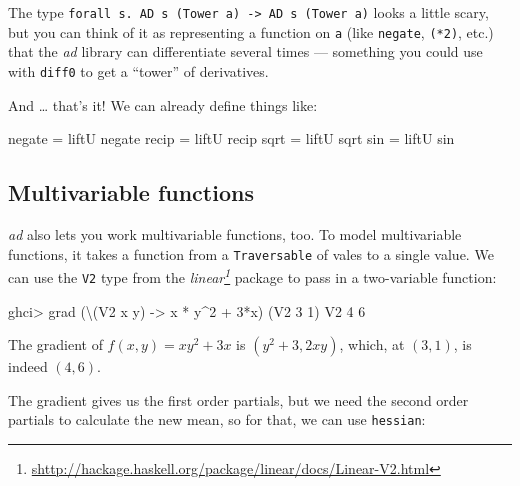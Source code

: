 \documentclass[]{article}
\newenvironment{Shaded}{}{}
\newcommand{\DataTypeTok}[1]{\textcolor[rgb]{0.56,0.13,0.00}{{#1}}}
\newcommand{\DecValTok}[1]{\textcolor[rgb]{0.25,0.63,0.44}{{#1}}}
\newcommand{\OtherTok}[1]{\textcolor[rgb]{0.00,0.44,0.13}{{#1}}}
\newcommand{\FunctionTok}[1]{\textcolor[rgb]{0.02,0.16,0.49}{{#1}}}
\newcommand{\NormalTok}[1]{{#1}}
\renewcommand{\href}[2]{#2\footnote{\url{#1}}}
\begin{document}
The type
\texttt{forall\ s.\ AD\ s\ (Tower\ a)\ -\textgreater{}\ AD\ s\ (Tower\ a)}
looks a little scary, but you can think of it as representing a function
on \texttt{a} (like \texttt{negate}, \texttt{(*2)}, etc.) that the
\emph{ad} library can differentiate several times --- something you
could use with \texttt{diff0} to get a ``tower'' of derivatives.

And \ldots{} that's it! We can already define things like:

\begin{Shaded}
\begin{Highlighting}[]
\NormalTok{negate }\FunctionTok{=} \NormalTok{liftU negate}
\NormalTok{recip  }\FunctionTok{=} \NormalTok{liftU recip}
\NormalTok{sqrt   }\FunctionTok{=} \NormalTok{liftU sqrt}
\NormalTok{sin    }\FunctionTok{=} \NormalTok{liftU sin}
\end{Highlighting}
\end{Shaded}

\subsection{Multivariable functions}\label{multivariable-functions}

\emph{ad} also lets you work multivariable functions, too. To model
multivariable functions, it takes a function from a \texttt{Traversable}
of vales to a single value. We can use the \texttt{V2} type from the
\emph{\href{shttp://hackage.haskell.org/package/linear/docs/Linear-V2.html}{linear}}
package to pass in a two-variable function:

\begin{Shaded}
\begin{Highlighting}[]
\NormalTok{ghci}\FunctionTok{>} \NormalTok{grad (\textbackslash{}(}\DataTypeTok{V2} \NormalTok{x y) }\OtherTok{->} \NormalTok{x }\FunctionTok{*} \NormalTok{y}\FunctionTok{^}\DecValTok{2} \FunctionTok{+} \DecValTok{3}\FunctionTok{*}\NormalTok{x) (}\DataTypeTok{V2} \DecValTok{3} \DecValTok{1}\NormalTok{)}
\DataTypeTok{V2} \DecValTok{4} \DecValTok{6}
\end{Highlighting}
\end{Shaded}

The gradient of \(f(x, y) = x y^2 + 3x\) is \((y^2 + 3, 2xy)\), which,
at \((3, 1)\), is indeed \((4, 6)\).

The gradient gives us the first order partials, but we need the second
order partials to calculate the new mean, so for that, we can use
\texttt{hessian}:
\end{document}
